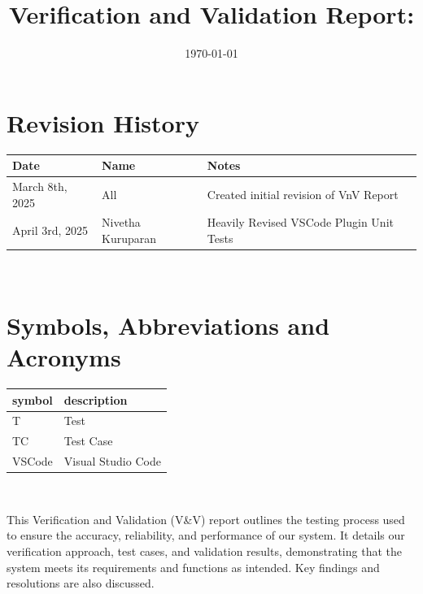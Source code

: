 \documentclass[12pt, titlepage]{article}
\begin{document}
\title{Verification and Validation Report: \progname}
\author{\authname}
\date{\today}

\maketitle


\section*{Revision History}

\begin{tabularx}{\textwidth}{p{4cm}p{4cm}X}
  \toprule {\bf Date} & {\bf Name} & {\bf Notes}\\
  \midrule
  March 8th, 2025 & All & Created initial revision of VnV Report\\
  April 3rd, 2025 & Nivetha Kuruparan & Heavily Revised VSCode Plugin Unit Tests\\
  \bottomrule
\end{tabularx}

~\newpage

\section*{Symbols, Abbreviations and Acronyms}

\renewcommand{\arraystretch}{1.2}
\begin{tabular}{l l}
  \toprule
  \textbf{symbol} & \textbf{description}\\
  \midrule
  T & Test\\
  TC & Test Case\\
  VSCode & Visual Studio Code\\
  \bottomrule
\end{tabular}\\


\newpage

\tableofcontents

\listoftables %

\listoffigures %

\newpage


\noindent This Verification and Validation (V\&V) report outlines the testing
process used to ensure the accuracy, reliability, and performance of
our system. It details our verification approach, test cases, and
validation results, demonstrating that the system meets its
requirements and functions as intended. Key findings and resolutions
are also discussed.
\end{document}
